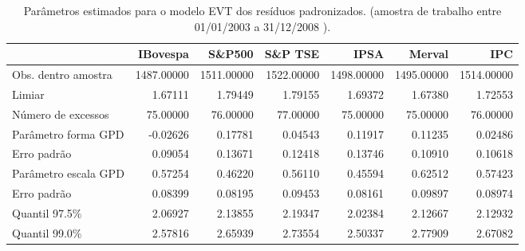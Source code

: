 \begin{table}[H]
\centering
\caption{Parâmetros estimados para o modelo EVT dos resíduos padronizados. 
               (amostra de trabalho entre 01/01/2003 a 31/12/2008 ).} 
\label{tab:evtcoef}
\begin{tabular}{lrrrrrr}
  \hline
 & IBovespa & S\&P500 & S\&P TSE & IPSA & Merval & IPC \\ 
  \hline
Obs. dentro amostra & 1487.00000 & 1511.00000 & 1522.00000 & 1498.00000 & 1495.00000 & 1514.00000 \\ 
  Limiar & 1.67111 & 1.79449 & 1.79155 & 1.69372 & 1.67380 & 1.72553 \\ 
  Número de excessos & 75.00000 & 76.00000 & 77.00000 & 75.00000 & 75.00000 & 76.00000 \\ 
  Parâmetro forma GPD & -0.02626 & 0.17781 & 0.04543 & 0.11917 & 0.11235 & 0.02486 \\ 
  Erro padrão & 0.09054 & 0.13671 & 0.12418 & 0.13746 & 0.10910 & 0.10618 \\ 
  Parâmetro escala GPD & 0.57254 & 0.46220 & 0.56110 & 0.45594 & 0.62512 & 0.57423 \\ 
  Erro padrão & 0.08399 & 0.08195 & 0.09453 & 0.08161 & 0.09897 & 0.08974 \\ 
  Quantil 97.5\% & 2.06927 & 2.13855 & 2.19347 & 2.02384 & 2.12667 & 2.12932 \\ 
  Quantil 99.0\% & 2.57816 & 2.65939 & 2.73554 & 2.50337 & 2.77909 & 2.67082 \\ 
   \hline
\end{tabular}
\end{table}
